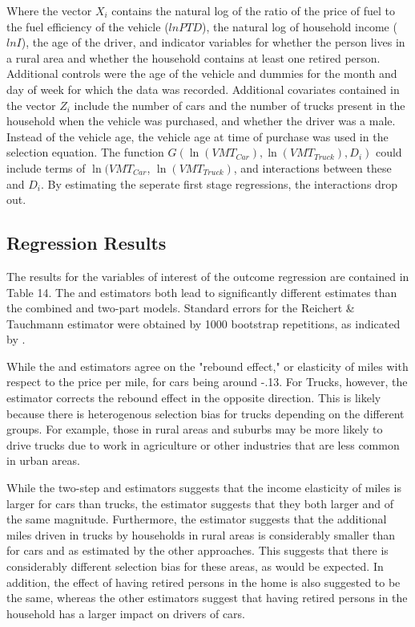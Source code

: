 \documentclass{article}
\begin{document}
Where the vector $X_i$ contains the natural log of the ratio of the price of fuel to the fuel efficiency of the vehicle ($lnPTD$), the natural log of household income ($lnI$), the age of the driver, and indicator variables for whether the person lives in a rural area and whether the household contains at least one retired person.  Additional controls were the age of the vehicle and dummies for the month and day of week for which the data was recorded.  Additional covariates contained in the vector $Z_i$ include the number of cars and the number of trucks present in the household when the vehicle was purchased, and whether the driver was a male.  Instead of the vehicle age, the vehicle age at time of purchase was used in the selection equation.  The function $G(\ln(VMT_{Car}), \ln(VMT_{Truck}), D_i)$ could include terms of $\ln(VMT_{Car}$, $\ln(VMT_{Truck})$, and interactions between these and $D_i$.  By estimating the seperate first stage regressions, the interactions drop out.


\subsection{Regression Results}

The results for the variables of interest of the outcome regression are contained in Table 14.  The \citet{heckman1979} and \citet{reichert2014} estimators both lead to significantly different estimates than the combined and two-part models.  Standard errors for the Reichert \& Tauchmann estimator were obtained by 1000 bootstrap repetitions, as indicated by \dagger.
%

\begin{table}[htbp]



\end{table}

While the \citet{heckman1979} and \citet{reichert2014} estimators agree on the "rebound effect," or elasticity of miles with respect to the price per mile, for cars being around -.13.  For Trucks, however, the \citet{heckman1979} estimator corrects the rebound effect in the opposite direction.  This is likely because there is heterogenous selection bias for trucks depending on the different groups.  For example, those in rural areas and suburbs may be more likely to drive trucks due to work in agriculture or other industries that are less common in urban areas.

While the two-step and \citet{heckman1979} estimators suggests that the income elasticity of miles is larger for cars than trucks, the \citet{reichert2014} estimator suggests that they both larger and of the same magnitude.  Furthermore, the \citet{reichert2014} estimator suggests that the additional miles driven in trucks by households in rural areas is considerably smaller than for cars and as estimated by the other approaches.  This suggests that there is considerably different selection bias for these areas, as would be expected.  In addition, the effect of having retired persons in the home is also suggested to be the same, whereas the other estimators suggest that having retired persons in the household has a larger impact on drivers of cars.
\end{document}
